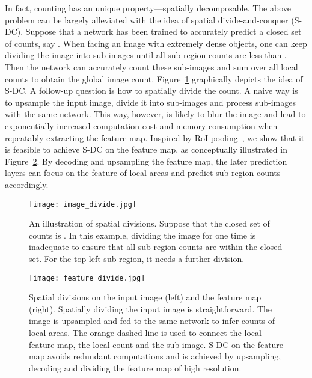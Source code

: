 \documentclass[10pt,twocolumn,letterpaper]{article}
\begin{document}
	In fact, counting has an unique property---spatially decomposable. The above problem can be largely alleviated with the idea of spatial divide-and-conquer (S-DC). Suppose that a network has been trained to accurately predict a closed set of counts, say . When facing an image with extremely dense objects, one can keep dividing the image into sub-images until all sub-region counts are less than . Then the network can accurately count these sub-images and sum over all local counts to obtain the global image count. Figure~\ref{fig:image_divide_example} graphically depicts the idea of S-DC. A follow-up question is how to spatially divide the count. A naive way is to upsample the input image, divide it into sub-images and process sub-images with the same network. This way, however, is likely to blur the image and lead to exponentially-increased computation cost and memory consumption when repeatably extracting the feature map. Inspired by RoI pooling~\cite{girshick2015fast}, we show that it is feasible to achieve S-DC on the feature map, as conceptually illustrated in Figure~\ref{fig:feature_divide}. By decoding and upsampling the feature map, the later prediction layers can focus on the feature of local areas and predict sub-region counts accordingly.
	
	\begin{figure}[t]
		\begin{center}
\texttt{[image: image\_divide.jpg]}
		\end{center}
		\vspace{-10pt}
		\caption{An illustration of spatial divisions. Suppose that the closed set of counts is . In this example, dividing the image for one time is inadequate to ensure that all sub-region counts are within the closed set. For the top left sub-region, it needs a further division. }
		\label{fig:image_divide_example}
	\end{figure}
	
	
	\begin{figure}[t]
		\begin{center}
\texttt{[image: feature\_divide.jpg]}
		\end{center}
		\vspace{-10pt}
		\caption{ Spatial divisions on the input image (left) and the feature map (right). Spatially dividing the input image is straightforward. The image is upsampled and fed to the same network to infer counts of local areas. The orange dashed line is used to connect the local feature map, the local count and the sub-image. S-DC on the feature map avoids redundant computations and is achieved by upsampling, decoding and dividing the feature map of high resolution.}
		\label{fig:feature_divide}
		\vspace{-10pt}
	\end{figure}
	
\end{document}
